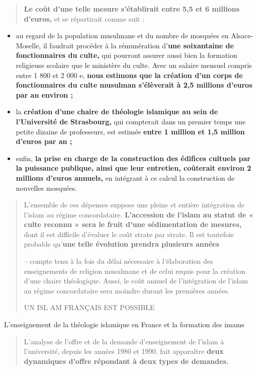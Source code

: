 \begin{quote}
\textbf{Le coût d'une telle mesure s'établirait entre 5,5 et 6 millions
d'euros,} et se répartirait comme suit :
\end{quote}

\begin{itemize}
\item
  au regard de la population musulmane et du nombre de mosquées en
  Alsace- Moselle, il faudrait procéder à la rémunération d'\textbf{une
  soixantaine de fonctionnaires du culte,} qui pourront assurer aussi
  bien la formation religieuse scolaire que le ministère du culte. Avec
  un salaire mensuel compris entre 1 800 et 2 000 e, \textbf{nous
  estimons que la création d'un corps de fonctionnaires du culte
  musulman s'élèverait à 2,5 millions d'euros par an environ ;}
\item
  la \textbf{création d'une chaire de théologie islamique au sein de
  l'Université de Strasbourg,} qui compterait dans un premier temps une
  petite dizaine de professeurs, est estimée \textbf{entre 1 million et
  1,5 million d'euros par an ;}
\item
  enfin, \textbf{la prise en charge de la construction des édifices
  cultuels par la puissance publique, ainsi que leur entretien,
  coûterait environ 2 millions d'euros annuels,} en intégrant à ce
  calcul la construction de nouvelles mosquées.
\end{itemize}

\begin{quote}
L'ensemble de ces dépenses suppose une pleine et entière intégration de
l'islam au régime concordataire. \textbf{L'accession de l'islam au
statut de « culte reconnu » sera le fruit d'une sédimentation de
mesures,} dont il est difficile d'évaluer le coût strate par strate. Il
est toutefois probable qu'\textbf{une telle évolution prendra plusieurs
années}

-- compte tenu à la fois du délai nécessaire à l'élaboration des
enseignements de religion musulmane et de celui requis pour la création
d'une chaire théologique. Aussi, le coût annuel de l'intégration de
l'islam au régime concordataire sera moindre durant les premières
années.

UN ISL AM FRANÇAIS EST POSSIBLE
\end{quote}

L'enseignement de la théologie islamique en France et la formation des
imams

\begin{quote}
L'analyse de l'offre et de la demande d'enseignement de l'islam à
l'université, depuis les années 1980 et 1990, fait apparaître
\textbf{deux dynamiques d'offre répondant à deux types de demandes.}
\end{quote}

